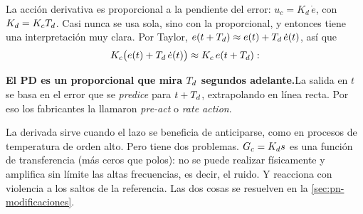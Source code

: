 La acción derivativa es proporcional a la pendiente del error: $u_c=K_d\,\dot e$, con $K_d=K_cT_d$. Casi nunca se usa sola, sino con la proporcional, y entonces tiene una interpretación muy clara. Por Taylor, $e(t+T_d)\approx e(t)+T_d\,\dot e(t)$, así que
\[
  K_c\bigl(e(t)+T_d\,\dot e(t)\bigr)\approx K_c\,e(t+T_d):
\]
\begin{ideaclave}
\textbf{El PD es un proporcional que mira $T_d$ segundos adelante.}\enspace La salida en $t$ se basa en el error que se \emph{predice} para $t+T_d$, extrapolando en línea recta. Por eso los fabricantes la llamaron \emph{pre-act} o \emph{rate action}.
\end{ideaclave}

La derivada sirve cuando el lazo se beneficia de anticiparse, como en procesos de temperatura de orden alto. Pero tiene dos problemas. $G_c=K_d s$ es una función de transferencia  (más ceros que polos): no se puede realizar físicamente y amplifica sin límite las altas frecuencias, es decir, el ruido. Y reacciona con violencia a los saltos de la referencia. Las dos cosas se resuelven en la \cref{sec:pn-modificaciones}.
